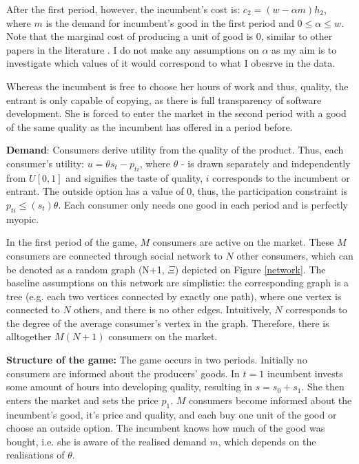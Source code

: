 \documentclass{article}
\numberwithin{figure}{section}
\numberwithin{table}{section}
\theoremstyle{indented}
\numberwithin{equation}{section} %
\begin{document}
After the first period, however, the incumbent's cost is: $c_2= (w-\alpha m)h_2$, where $m$ is the demand for incumbent's good in the first period and $0\leq \alpha \leq w$. Note that the marginal cost of producing a unit of good is 0, similar to other papers in the literature \citep{Ajorlou2018}. I do not make any assumptions on $\alpha$ as my aim is to investigate which values of it would correspond to what I obesrve in the data.

Whereas the incumbent is free to choose her hours of work and thus, quality, the entrant is only capable of copying, as there is full transparency of software development.  She is forced to enter the market in the second period with a good of the same quality as the incumbent has offered in a period before.

\textbf{Demand}: 
Consumers derive utility from the quality of the product. Thus, each consumer's utility: $u = \theta s_t - p_{ti}$, where $\theta$ - is drawn separately and independently from $U[0,1]$ and signifies the taste of quality, $i$ corresponds to the incumbent or entrant. The outside option has a value of 0, thus, the participation constraint is $p_{ti}\leq (s_t) \theta$.  Each consumer only needs one good in each period and is perfectly myopic.


In the first period of the game, $M$ consumers are active on the market. These $M$ consumers are connected through social network to $N$ other consumers, which can be denoted as a random graph (N+1, $\Xi$) depicted on Figure \ref{network}. The baseline assumptions on this network are simplistic: the corresponding graph is a tree (e.g. each two vertices connected by exactly one path), where one vertex is connected to $N$ others, and there is no other edges. Intuitively, $N$ corresponds to the degree of the average consumer's vertex in the graph. Therefore, there is alltogether $M(N+1)$ consumers on the market.

\textbf{Structure of the game:}
The game occurs in two periods. Initially no consumers are informed about the producers' goods. In \textbf{$t=1$} incumbent invests some amount of hours into developing quality, resulting in $s = s_0+s_1$. She then enters the market and sets the price $p_1$. $M$ consumers become informed about the incumbent's good, it's price and quality, and each buy one unit of the good or choose an outside option. The incumbent knows how much of the good was bought, i.e. she is aware of the realised demand $m$, which depends on the realisations of $\theta$. 
\end{document}
